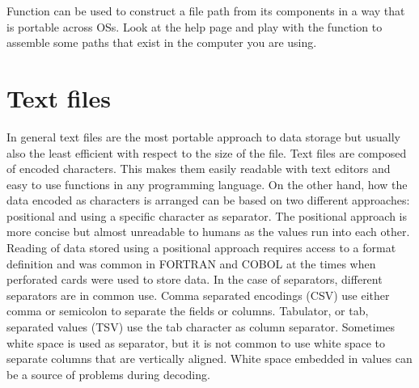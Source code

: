 \documentclass[krantz2]{krantz}\usepackage{knitr}%
\begin{document}
\begin{playground}
Function  can be used to construct a file path from its components in a way that is portable across OSs. Look at the help page and play with the function to assemble some paths that exist in the computer you are using.
\end{playground}

\section{Text files}\label{sec:files:txt}

In general text files are the most portable approach to data storage but usually also the least efficient with respect to the size of the file. Text files are composed of encoded characters. This makes them easily readable with text editors and easy to use functions in any programming language. On the other hand, how the data encoded as characters is arranged can be based on two different approaches: positional and using a specific character as separator. The positional approach is more concise but almost unreadable to humans as the values run into each other. Reading of data stored using a positional approach requires access to a format definition and was common in FORTRAN and COBOL at the times when perforated cards were used to store data. In the case of separators, different separators are in common use. Comma separated encodings (CSV) use either comma or semicolon to separate the fields or columns. Tabulator, or tab, separated values (TSV) use the tab character as column separator. Sometimes white space is used as separator, but it is not common to use white space to separate columns that are vertically aligned. White space embedded in values can be a source of problems during decoding.
\end{document}
